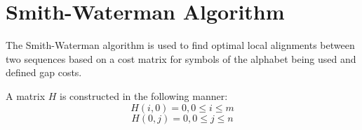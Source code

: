 \usepackage{amsmath}

\section{Smith-Waterman Algorithm}

The Smith-Waterman algorithm is used to find optimal local alignments between two sequences based on a cost matrix for symbols of the alphabet being used and defined gap costs.

A matrix $H$ is constructed in the following manner:
\[ H(i,0) = 0, 0 \leq i \leq m \]
\[ H(0,j) = 0, 0 \leq j \leq n \]
